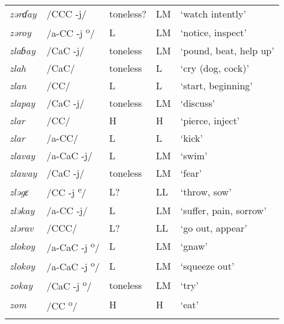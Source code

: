 \begin{small}
\begin{longtable}{lp{1.75cm}p{1.75cm}p{1.75cm}p{3cm}}
\textit{zərɗay} & /CCC -j/ & toneless? & LM & ‘watch intently’\\
\textit{zəroy} & /a-CC -j\textsuperscript{ o}/ & L & LM & ‘notice, inspect’\\
\textit{zlaɓay} & /CaC -j/ & toneless & LM & ‘pound, beat, help up’\\
\textit{zlah} & /CaC/ & toneless & L & ‘cry (dog, cock)’\\
\textit{zlan} & /CC/ & L & L & ‘start, beginning’\\
\textit{zlapay} & /CaC -j/ & toneless & LM & ‘discuss’\\
\textit{zlar} & /CC/ & H & H & ‘pierce, inject’\\
\textit{zlar} & /a-CC/ & L & L & ‘kick’\\
\textit{zlavay} & /a-CaC -j/ & L & LM & ‘swim’\\
\textit{zlaway} & /CaC -j/ & toneless & LM & ‘fear’\\
\textit{zləgɛ} & /CC -j \textsuperscript{e}/ & L? & LL & ‘throw, sow’\\
\textit{zləkay} & /a-CC -j/ & L & LM & ‘suffer, pain, sorrow’\\
\textit{zlərav} & /CCC/ & L? & LL & ‘go out, appear’\\
\textit{zlokoy} & /a-CaC -j\textsuperscript{ o}/ & L & LM & ‘gnaw’\\
\textit{zlokoy} & /a-CaC -j\textsuperscript{ o}/ & L & LM & ‘squeeze out’\\
\textit{zokay} & /CaC -j\textsuperscript{ o}/ & toneless & LM & ‘try’\\
\textit{zom} & /CC \textsuperscript{o}/ & H & H & ‘eat’\\
\lspbottomrule
\end{longtable}
\end{small}

